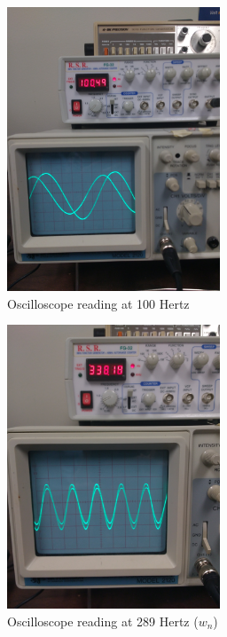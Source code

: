 \documentclass[12pt]{article}
\begin{document}
\begin{figure}[h!] %
   \centering
   \includegraphics[width=2.5in]{below_nat_freq.jpg} 
   \caption{Oscilloscope reading at 100 Hertz}
   \label{fig:example}
\end{figure}

\newpage

\begin{figure}[h!] %
   \centering
   \includegraphics[width=2.5in]{at_nat_freq.jpg} 
   \caption{Oscilloscope reading at 289 Hertz ($w_{n}$)}
   \label{fig:example}
\end{figure}
\bigskip
\end{document}
